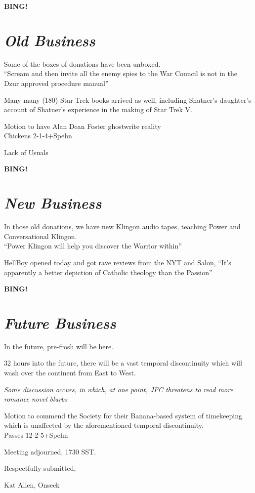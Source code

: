 \documentclass[10pt]{article}
\newcommand{\bing}{{\bf BING!} }
\newcommand{\goto}[1]{\bing \vskip 12pt \section*{{\em{#1}}}}
\begin{document}
\goto{Old Business}
Some of the boxes of donations have been unboxed.\\
``Scream and then invite all the enemy spies to the War Council is not
in the Dzur approved procedure manual''

Many many (180) Star Trek books arrived as well, including Shatner's
daughter's account of Shatner's experience in the making of Star Trek
V.

Motion to have Alan Dean Foster ghostwrite reality\\
Chickens 2-1-4+Spehn

Lack of Usuals

\goto{New Business}
In those old donations, we have new Klingon audio tapes, teaching
Power and Conversational Klingon.\\
``Power Klingon will help you discover the Warrior within''

HellBoy opened today and got rave reviews from the NYT and Salon,
``It's apparently a better depiction of Catholic theology than the
Passion''

\goto{Future Business}
In the future, pre-frosh will be here.

32 hours into the future, there will be a vast temporal discontinuity
which will wash over the continent from East to West.

\emph{Some discussion occurs, in which, at one point, JFC threatens to
  read more romance novel blurbs}

Motion to commend the Society for their Banana-based system of
timekeeping which is unaffected by the aforementioned temporal
discontinuity.\\
Passes 12-2-5+Spehn

\vspace{12pt}

\noindent
Meeting adjourned, 1730 SST.

\vspace{18pt}

\centerline{Respectfully submitted,}
\centerline{Kat Allen,  Onseck}
\end{document}
